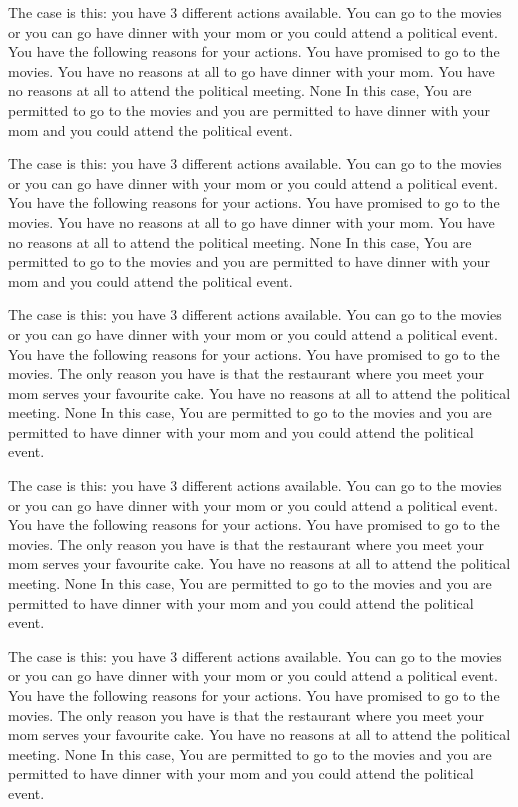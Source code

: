 The case is this: you have  3  different actions available.  You can go to the movies or you can go have dinner with your mom or you could attend a political event.
You have the following reasons for your actions.  You have promised to go to the movies. You have no reasons at all to go have dinner with your mom. You have no reasons at all to attend the political meeting. 
None
In this case,  You are permitted to go to the movies and you are permitted to have dinner with your mom and you could attend the political event.
 
The case is this: you have  3  different actions available.  You can go to the movies or you can go have dinner with your mom or you could attend a political event.
You have the following reasons for your actions.  You have promised to go to the movies. You have no reasons at all to go have dinner with your mom. You have no reasons at all to attend the political meeting. 
None
In this case,  You are permitted to go to the movies and you are permitted to have dinner with your mom and you could attend the political event.
 
The case is this: you have  3  different actions available.  You can go to the movies or you can go have dinner with your mom or you could attend a political event.
You have the following reasons for your actions.  You have promised to go to the movies. The only reason you have is that the restaurant where you meet your mom serves your favourite cake. You have no reasons at all to attend the political meeting. 
None
In this case,  You are permitted to go to the movies and you are permitted to have dinner with your mom and you could attend the political event.
 
The case is this: you have  3  different actions available.  You can go to the movies or you can go have dinner with your mom or you could attend a political event.
You have the following reasons for your actions.  You have promised to go to the movies. The only reason you have is that the restaurant where you meet your mom serves your favourite cake. You have no reasons at all to attend the political meeting. 
None
In this case,  You are permitted to go to the movies and you are permitted to have dinner with your mom and you could attend the political event.
 
The case is this: you have  3  different actions available.  You can go to the movies or you can go have dinner with your mom or you could attend a political event.
You have the following reasons for your actions.  You have promised to go to the movies. The only reason you have is that the restaurant where you meet your mom serves your favourite cake. You have no reasons at all to attend the political meeting. 
None
In this case,  You are permitted to go to the movies and you are permitted to have dinner with your mom and you could attend the political event.
 
